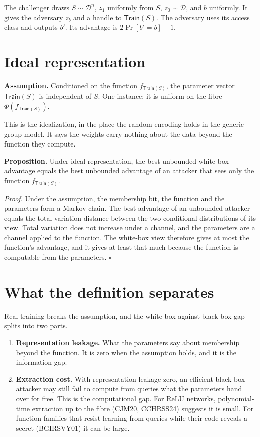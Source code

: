 \documentclass[
]{article}
\providecommand{\tightlist}{%
  \setlength{\itemsep}{0pt}\setlength{\parskip}{0pt}}
\begin{document}
The challenger draws \(S \sim \mathcal{D}^n\), \(z_1\) uniformly from
\(S\), \(z_0 \sim \mathcal{D}\), and \(b\) uniformly. It gives the
adversary \(z_b\) and a handle to \(\mathsf{Train}(S)\). The adversary
uses its access class and outputs \(b'\). Its advantage is
\(2\Pr[b'=b]-1\).

\section{Ideal representation}\label{ideal-representation}

\textbf{Assumption.} Conditioned on the function
\(f_{\mathsf{Train}(S)}\), the parameter vector \(\mathsf{Train}(S)\) is
independent of \(S\). One instance: it is uniform on the fibre
\(\Phi(f_{\mathsf{Train}(S)})\).

This is the idealization, in the place the random encoding holds in the
generic group model. It says the weights carry nothing about the data
beyond the function they compute.

\textbf{Proposition.} Under ideal representation, the best unbounded
white-box advantage equals the best unbounded advantage of an attacker
that sees only the function \(f_{\mathsf{Train}(S)}\).

\emph{Proof.} Under the assumption, the membership bit, the function and
the parameters form a Markov chain. The best advantage of an unbounded
attacker equals the total variation distance between the two conditional
distributions of its view. Total variation does not increase under a
channel, and the parameters are a channel applied to the function. The
white-box view therefore gives at most the function's advantage, and it
gives at least that much because the function is computable from the
parameters. \(\square\)

\section{What the definition
separates}\label{what-the-definition-separates}

Real training breaks the assumption, and the white-box against black-box
gap splits into two parts.

\begin{enumerate}
\def\labelenumi{\arabic{enumi}.}
\tightlist
\item
  \textbf{Representation leakage.} What the parameters say about
  membership beyond the function. It is zero when the assumption holds,
  and it is the information gap.
\item
  \textbf{Extraction cost.} With representation leakage zero, an
  efficient black-box attacker may still fail to compute from queries
  what the parameters hand over for free. This is the computational gap.
  For ReLU networks, polynomial-time extraction up to the fibre (CJM20,
  CCHRSS24) suggests it is small. For function families that resist
  learning from queries while their code reveals a secret (BGIRSVY01) it
  can be large.
\end{enumerate}
\end{document}
